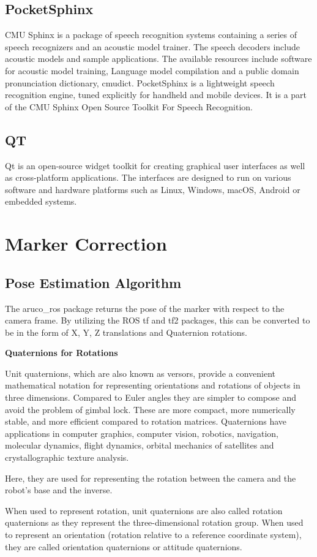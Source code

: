 \documentclass[12pt]{article}
\begin{document}
 \subsection{PocketSphinx}
 CMU Sphinx is a package of speech recognition systems containing a series of speech recognizers and an acoustic model trainer. The speech decoders include acoustic models and sample applications. The available resources include software for acoustic model training, Language model compilation and a public domain pronunciation dictionary, cmudict.
PocketSphinx is a lightweight speech recognition engine, tuned explicitly for handheld and mobile devices. It is a part of the CMU Sphinx Open Source Toolkit For Speech Recognition.

\subsection{QT}
Qt is an open-source widget toolkit for creating graphical user interfaces as well as cross-platform applications. The interfaces are designed to run on various software and hardware platforms such as Linux, Windows, macOS, Android or embedded systems.

\newpage

\section{Marker Correction}

\subsection{Pose Estimation Algorithm}
\par The aruco\_ros package returns the pose of the marker with respect to the camera frame. By utilizing the ROS tf and tf2 packages, this can be converted to be in the form of X, Y, Z translations and Quaternion rotations.
\par \textbf{Quaternions for Rotations}
\par Unit quaternions, which are also known as versors, provide a convenient mathematical notation for representing orientations and rotations of objects in three dimensions. Compared to Euler angles they are simpler to compose and avoid the problem of gimbal lock. These are more compact, more numerically stable, and more efficient compared to rotation matrices. Quaternions have applications in computer graphics, computer vision, robotics, navigation, molecular dynamics, flight dynamics, orbital mechanics of satellites and crystallographic texture analysis.
\par Here, they are used for representing the rotation between the camera and the robot's base and the inverse.
\par When used to represent rotation, unit quaternions are also called rotation quaternions as they represent the three-dimensional rotation group. When used to represent an orientation (rotation relative to a reference coordinate system), they are called orientation quaternions or attitude quaternions.
\end{document}
